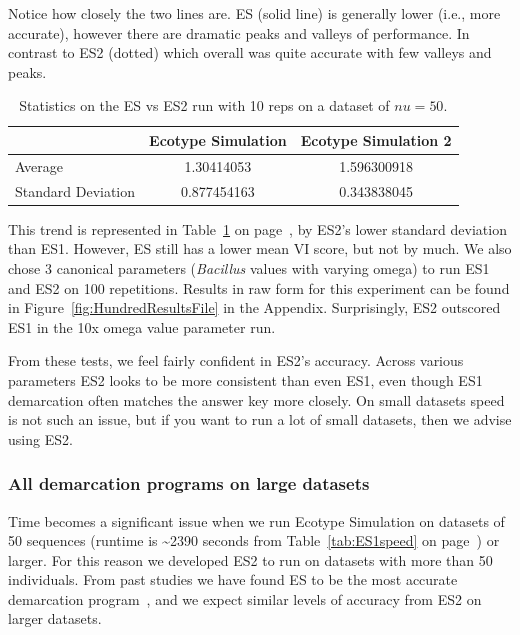 \noindent Notice how closely the two lines are.
ES (solid line) is generally lower (i.e., more accurate), however there are dramatic peaks and valleys of performance.
In contrast to ES2 (dotted) which overall was quite accurate with few valleys and peaks.
\begin{table}
    \begin{tabular}{l|cc}
    ~                  & Ecotype Simulation & Ecotype Simulation 2 \\ \hline
    Average            & 1.30414053         & 1.596300918          \\
    Standard Deviation & 0.877454163        & 0.343838045          \\
    \end{tabular}
    \caption[ES versus ES2 statistics.]{Statistics on the ES vs ES2 run with 10 reps on a dataset of $nu=50$.}
    \label{tab:ESvES2mean}
\end{table}
This trend is represented in Table~\ref{tab:ESvES2mean} on page~\pageref{tab:ESvES2mean}, by ES2's lower standard deviation than ES1.
However, ES still has a lower mean VI score, but not by much.
We also chose 3 canonical parameters (\emph{Bacillus} values with varying omega) to run ES1 and ES2 on 100 repetitions.
Results in raw form for this experiment can be found in Figure~\ref{fig:HundredResultsFile} in the Appendix.
Surprisingly, ES2 outscored ES1 in the 10x omega value parameter run.

From these tests, we feel fairly confident in ES2's accuracy.
Across various parameters ES2 looks to be more consistent than even ES1, even though ES1 demarcation often matches the answer key more closely.
On small datasets speed is not such an issue, but if you want to run a lot of small datasets, then we advise using ES2.

\subsubsection*{All demarcation programs on large datasets}
Time becomes a significant issue when we run Ecotype Simulation on datasets of 50 sequences (runtime is \textasciitilde2390 seconds from Table~\ref{tab:ES1speed} on page~\pageref{tab:ES1speed}) or larger.
For this reason we developed ES2 to run on datasets with more than 50 individuals.
From past studies we have found ES to be the most accurate demarcation program~\cite{carlo}, and we expect similar levels of accuracy from ES2 on larger datasets.

